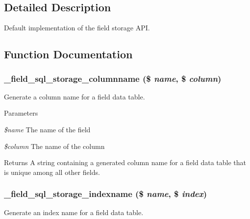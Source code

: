 \subsection{Detailed Description}
Default implementation of the field storage API. 

\subsection{Function Documentation}
\hypertarget{field__sql__storage_8module_a052b59d6260d1d0d9a0772133dc90364}{
\subsubsection[{\_\-field\_\-sql\_\-storage\_\-columnname}]{\setlength{\rightskip}{0pt plus 5cm}\_\-field\_\-sql\_\-storage\_\-columnname (\$ {\em name}, \/  \$ {\em column})}}
\label{field__sql__storage_8module_a052b59d6260d1d0d9a0772133dc90364}
Generate a column name for a field data table.


\begin{DoxyParams}{Parameters}
\item[{\em \$name}]The name of the field \item[{\em \$column}]The name of the column \end{DoxyParams}
\begin{DoxyReturn}{Returns}
A string containing a generated column name for a field data table that is unique among all other fields. 
\end{DoxyReturn}
\hypertarget{field__sql__storage_8module_af8752add19771b685ed69937003144f5}{
\subsubsection[{\_\-field\_\-sql\_\-storage\_\-indexname}]{\setlength{\rightskip}{0pt plus 5cm}\_\-field\_\-sql\_\-storage\_\-indexname (\$ {\em name}, \/  \$ {\em index})}}
\label{field__sql__storage_8module_af8752add19771b685ed69937003144f5}
Generate an index name for a field data table.


